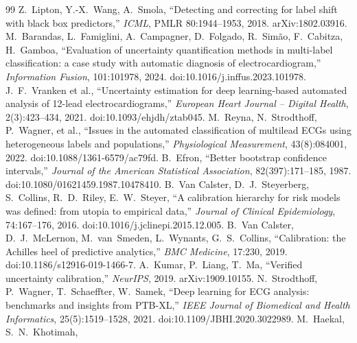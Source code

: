 \begin{thebibliography}{99}
 Z.~Lipton, Y.-X.~Wang, A.~Smola,
``Detecting and correcting for label shift with black box
predictors,'' \emph{ICML}, PMLR 80:1944--1953, 2018.
arXiv:1802.03916.
 M.~Barandas, L.~Famiglini, A.~Campagner,
D.~Folgado, R.~Sim\~ao, F.~Cabitza, H.~Gamboa, ``Evaluation of
uncertainty quantification methods in multi-label classification: a
case study with automatic diagnosis of electrocardiogram,''
\emph{Information Fusion}, 101:101978, 2024.
doi:10.1016/j.inffus.2023.101978.
 J.~F.~Vranken et al., ``Uncertainty estimation for
deep learning-based automated analysis of 12-lead
electrocardiograms,'' \emph{European Heart Journal -- Digital Health},
2(3):423--434, 2021. doi:10.1093/ehjdh/ztab045.
 M.~Reyna, N.~Strodthoff, P.~Wagner, et al.,
``Issues in the automated classification of multilead ECGs using
heterogeneous labels and populations,'' \emph{Physiological
Measurement}, 43(8):084001, 2022. doi:10.1088/1361-6579/ac79fd.
 B.~Efron, ``Better bootstrap confidence
intervals,'' \emph{Journal of the American Statistical Association},
82(397):171--185, 1987. doi:10.1080/01621459.1987.10478410.
 B.~Van Calster, D.~J.~Steyerberg,
S.~Collins, R.~D.~Riley, E.~W.~Steyer, ``A calibration hierarchy for
risk models was defined: from utopia to empirical data,''
\emph{Journal of Clinical Epidemiology}, 74:167--176, 2016.
doi:10.1016/j.jclinepi.2015.12.005.
 B.~Van Calster, D.~J.~McLernon,
M.~van~Smeden, L.~Wynants, G.~S.~Collins, ``Calibration: the Achilles
heel of predictive analytics,'' \emph{BMC Medicine}, 17:230, 2019.
doi:10.1186/s12916-019-1466-7.
 A.~Kumar, P.~Liang, T.~Ma, ``Verified uncertainty
calibration,'' \emph{NeurIPS}, 2019. arXiv:1909.10155.
 N.~Strodthoff, P.~Wagner, T.~Schaeffter,
W.~Samek, ``Deep learning for ECG analysis: benchmarks and insights
from PTB-XL,'' \emph{IEEE Journal of Biomedical and Health
Informatics}, 25(5):1519--1528, 2021.
doi:10.1109/JBHI.2020.3022989.
 M.~Haekal, S.~N.~Khotimah,

\end{thebibliography}
